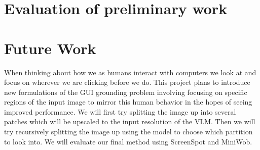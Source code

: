 \documentclass{article}
\begin{document}




\section{Evaluation of preliminary work}

\section{Future Work}

When thinking about how we as humans interact with computers we look at and focus on wherever we are clicking before we do. This project plans to introduce new formulations of the GUI grounding problem involving focusing on specific regions of the input image to mirror this human behavior in the hopes of seeing improved performance. We will first try splitting the image up into several patches which will be upscaled to the input resolution of the VLM. Then we will try recursively splitting the image up using the model to choose which partition to look into. We will evaluate our final method using ScreenSpot and MiniWob. 
\end{document}
